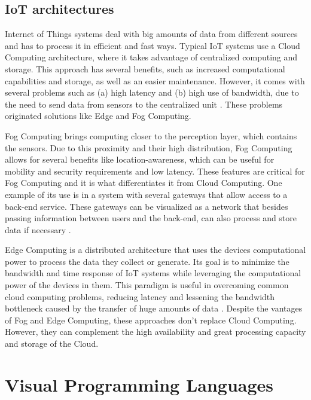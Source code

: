 \subsection{IoT architectures}\label{sec:architectures}

Internet of Things systems deal with big amounts of data from different sources and has to process it in efficient and fast ways. Typical IoT systems use a Cloud Computing architecture, where it takes advantage of centralized computing and storage. This approach has several benefits, such as increased computational capabilities and storage, as well as an easier maintenance. However, it comes with several problems such as (a) high latency and (b) high use of bandwidth, due to the need to send data from sensors to the centralized unit \cite{connecting_fog_and_cloud}. These problems originated solutions like Edge and Fog Computing.
\par Fog Computing brings computing closer to the perception layer, which contains the sensors. Due to this proximity and their high distribution, Fog Computing allows for several benefits like location-awareness, which can be useful for mobility and security requirements and low latency. These features are critical for Fog Computing and it is what differentiates it from Cloud Computing. One example of its use is in a system with several gateways that allow access to a back-end service. These gateways can be visualized as a network that besides passing information between users and the back-end, can also process and store data if necessary \cite{fog_computing_book}. 
\par Edge Computing is a distributed architecture that uses the devices computational power to process the data they collect or generate. Its goal is to minimize the bandwidth and time response of IoT systems while leveraging the computational power of the devices in them. This paradigm is useful in overcoming common cloud computing problems, reducing latency and lessening the bandwidth bottleneck caused by the transfer of huge amounts of data \cite{edge_computing}. 
Despite the vantages of Fog and Edge Computing, these approaches don't replace Cloud Computing. However, they can complement the high availability and great processing capacity and storage of the Cloud.

\section{Visual Programming Languages}\label{sec:background_vpl}

